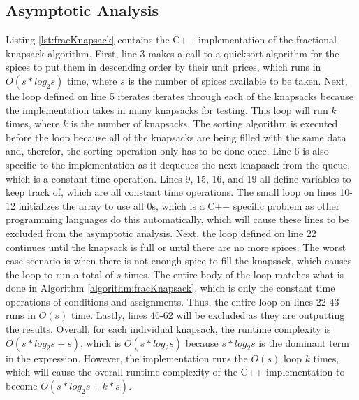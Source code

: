 \documentclass[letterpaper, 10pt,DIV=13]{scrartcl}
\numberwithin{equation}{section} %
\numberwithin{figure}{section} %
\numberwithin{table}{section} %
\begin{document}
\subsection{Asymptotic Analysis}
Listing \ref{lst:fracKnapsack} contains the C++ implementation of the fractional knapsack algorithm. First, line 3 makes a call to a quicksort algorithm for the spices to put them in descending order by their unit prices, which runs in $O(s * log_2s)$ time, where $s$ is the number of spices available to be taken. Next, the loop defined on line 5 iterates iterates through each of the knapsacks because the implementation takes in many knapsacks for testing. This loop will run $k$ times, where $k$ is the number of knapsacks. The sorting algorithm is executed before the loop because all of the knapsacks are being filled with the same data and, therefor, the sorting operation only has to be done once. Line 6 is also specific to the implementation as it dequeues the next knapsack from the queue, which is a constant time operation. Lines 9, 15, 16, and 19 all define variables to keep track of, which are all constant time operations. The small loop on lines 10-12 initializes the array to use all 0s, which is a C++ specific problem as other programming languages do this automatically, which will cause these lines to be excluded from the asymptotic analysis. Next, the loop defined on line 22 continues until the knapsack is full or until there are no more spices. The worst case scenario is when there is not enough spice to fill the knapsack, which causes the loop to run a total of $s$ times. The entire body of the loop matches what is done in Algorithm \ref{algorithm:fracKnapsack}, which is only the constant time operations of conditions and assignments. Thus, the entire loop on lines 22-43 runs in $O(s)$ time. Lastly, lines 46-62 will be excluded as they are outputting the results. Overall, for each individual knapsack, the runtime complexity is $O(s * log_2s + s)$, which is $O(s * log_2s)$ because $s * log_2s$ is the dominant term in the expression. However, the implementation runs the $O(s)$ loop $k$ times, which will cause the overall runtime complexity of the C++ implementation to become $O(s * log_2s + k * s)$.

\lstset{numbers=left, numberstyle=\tiny, stepnumber=1, numbersep=5pt}

\end{document}

